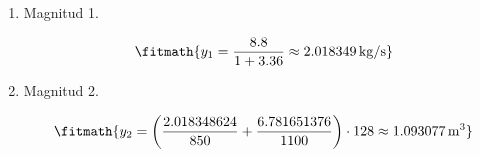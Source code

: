 \begin{enumerate}

\item Magnitud 1.

\[\fitmath{y_{1}=\frac{8.8}{1+3.36}\approx 2.018349\,\mathrm{kg/s}}\]

\item Magnitud 2.

\[\fitmath{y_{2}=\left(\frac{2.018348624}{850}+\frac{6.781651376}{1100}\right)\cdot 128\approx 1.093077\,\mathrm{m^{3}}}\]

\end{enumerate}

